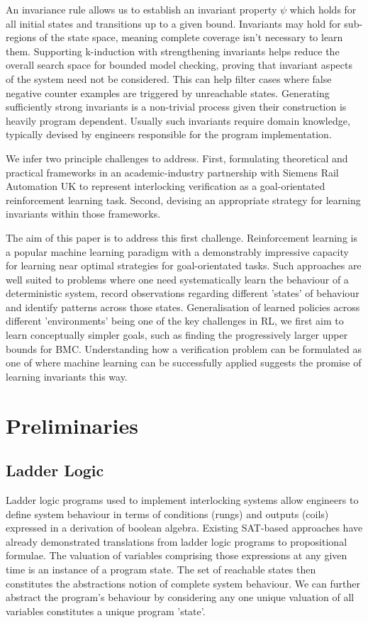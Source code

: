 \documentclass[runningheads]{llncs}
\begin{document}
An invariance rule allows us to establish an invariant property $\psi$ which holds for all initial states and transitions up to a given bound. Invariants may hold for sub-regions of the state space, meaning complete coverage isn't necessary to learn them. Supporting k-induction with strengthening invariants helps reduce the overall search space for bounded model checking, proving that invariant aspects of the system need not be considered. This can help filter cases where false negative counter examples are triggered by unreachable states. Generating sufficiently strong invariants is a non-trivial process given their construction is heavily program dependent. Usually such invariants require domain knowledge, typically devised by engineers responsible for the program implementation. 

We infer two principle challenges to address. First, formulating theoretical and practical frameworks in an academic-industry partnership with Siemens Rail Automation UK to represent interlocking verification as a goal-orientated reinforcement learning task. Second, devising an appropriate strategy for learning invariants within those frameworks.

The aim of this paper is to address this first challenge. Reinforcement learning is a popular machine learning paradigm with a demonstrably impressive capacity for learning near optimal strategies for goal-orientated tasks. Such approaches are well suited to problems where one need systematically learn the behaviour of a deterministic system, record observations regarding different 'states' of behaviour and identify patterns across those states. Generalisation of learned policies across different 'environments' being one of the key challenges in RL, we first aim to learn conceptually simpler goals, such as finding the progressively larger upper bounds for BMC. Understanding how a verification problem can be formulated as one of where machine learning can be successfully applied suggests the promise of learning invariants this way.


\section{Preliminaries}\label{sec:preliminaries}

\subsection{Ladder Logic}
Ladder logic programs used to implement interlocking systems allow engineers to define system behaviour in terms of conditions (rungs) and outputs (coils) expressed in a derivation of boolean algebra. Existing SAT-based approaches have already demonstrated translations from ladder logic programs to propositional formulae. The valuation of variables comprising those expressions at any given time is an instance of a program state. The set of reachable states then constitutes the abstractions notion of complete system behaviour. We can further abstract the program's behaviour by considering any one unique valuation of all variables constitutes a unique program 'state'. 
\end{document}
